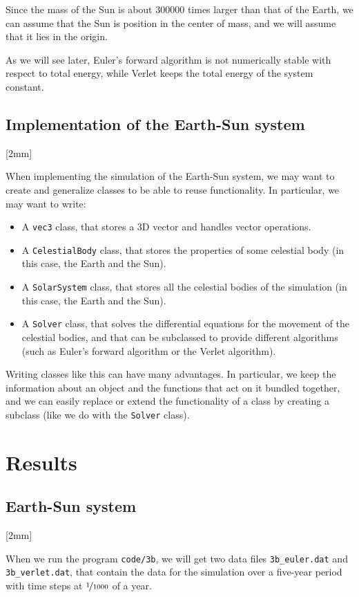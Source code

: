 \documentclass[11pt,a4paper]{article}
\newcommand\oppg[1]{\reversemarginnote{\textcolor{black!40}{#1)}}[2mm]}
\begin{document}
Since the mass of the Sun is about \num{300000} times larger than that of the Earth, we can assume that the Sun is position in the center of mass, and we will assume that it lies in the origin.

As we will see later, Euler's forward algorithm is not numerically stable with respect to total energy, while Verlet keeps the total energy of the system constant.

\subsection{Implementation of the Earth-Sun system}
\oppg{b}

When implementing the simulation of the Earth-Sun system, we may want to create and generalize classes to be able to reuse functionality. In particular, we may want to write:
\begin{itemize}
  \item A \texttt{vec3} class, that stores a 3D vector and handles vector operations.
  \item A \texttt{CelestialBody} class, that stores the properties of some celestial body (in this case, the Earth and the Sun).
  \item A \texttt{SolarSystem} class, that stores all the celestial bodies of the simulation (in this case, the Earth and the Sun).
  \item A \texttt{Solver} class, that solves the differential equations for the movement of the celestial bodies, and that can be subclassed to provide different algorithms (such as Euler's forward algorithm or the Verlet algorithm).
\end{itemize}

Writing classes like this can have many advantages. In particular, we keep the information about an object and the functions that act on it bundled together, and we can easily replace or extend the functionality of a class by creating a subclass (like we do with the \texttt{Solver} class).

\clearpage
\section{Results}

\subsection{Earth-Sun system}
\oppg{c}

When we run the program \texttt{code/3b}, we will get two data files \texttt{3b\_euler.dat} and \texttt{3b\_verlet.dat}, that contain the data for the simulation over a five-year period with time steps at $\nicefrac{1}{1000}$ of a year.
\end{document}
